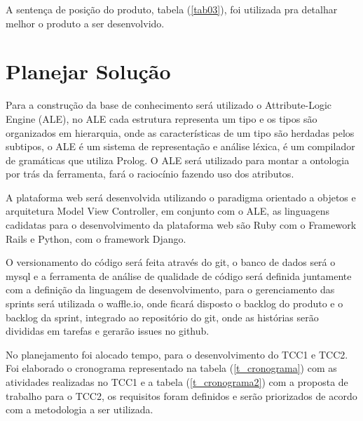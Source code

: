 A sentença de posição do produto, tabela (\ref{tab03}), foi utilizada pra detalhar melhor o produto a ser desenvolvido.

\newpage

\section {Planejar Solução}


Para a construção da base de conhecimento será utilizado o Attribute-Logic Engine (ALE), no ALE cada estrutura representa um tipo e os tipos são organizados em hierarquia, onde as características de um tipo são herdadas pelos subtipos, o ALE é um sistema de representação e análise léxica, é um compilador de gramáticas que utiliza Prolog. O ALE será utilizado para montar a ontologia por trás da ferramenta, fará o raciocínio fazendo uso dos atributos.

A plataforma web será desenvolvida utilizando o paradigma orientado a objetos e arquitetura Model View Controller, em conjunto com o ALE, as linguagens cadidatas para o desenvolvimento da plataforma web são Ruby com o Framework Rails e Python, com o framework Django.

O versionamento do código será feita através do git, o banco de dados será o mysql e a ferramenta de análise de qualidade de código será definida juntamente com a definição da linguagem de desenvolvimento, para o gerenciamento das sprints será utilizada o waffle.io, onde ficará disposto o backlog do produto e o backlog da sprint, integrado ao repositório do git, onde as histórias serão divididas em tarefas e gerarão issues no github.

No planejamento foi alocado tempo, para o desenvolvimento do TCC1 e TCC2. Foi elaborado o cronograma representado na tabela (\ref{t_cronograma}) com as atividades realizadas no TCC1 e a tabela (\ref{t_cronograma2}) com a proposta de trabalho para o TCC2, os requisitos foram definidos e serão priorizados de acordo com a metodologia a ser utilizada.

